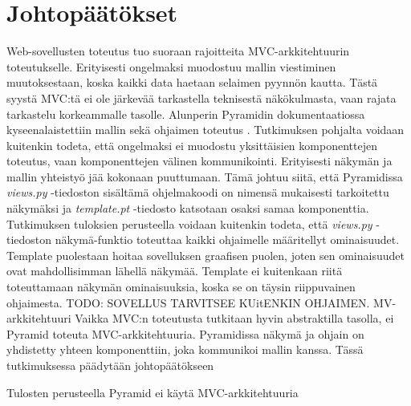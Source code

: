 \documentclass[finnish,utf8,nonumbib,palatino,kandi]{gradu2}
\begin{document}
\section{Johtopäätökset}
Web-sovellusten toteutus tuo suoraan rajoitteita MVC-arkkitehtuurin toteutukselle. Erityisesti ongelmaksi muodostuu mallin viestiminen muutoksestaan, koska kaikki data haetaan selaimen pyynnön kautta. Tästä
syystä MVC:tä ei ole järkevää tarkastella teknisestä näkökulmasta, vaan rajata tarkastelu korkeammalle tasolle. 
Alunperin Pyramidin dokumentaatiossa kyseenalaistettiin mallin sekä ohjaimen toteutus \cite{Pyramid:intr}. Tutkimuksen pohjalta voidaan kuitenkin
todeta, että ongelmaksi ei muodostu yksittäisien komponenttejen toteutus, vaan komponenttejen välinen kommunikointi. Erityisesti näkymän ja mallin yhteistyö jää
kokonaan puuttumaan. Tämä johtuu siitä, että Pyramidissa \emph{views.py} -tiedoston sisältämä ohjelmakoodi on nimensä mukaisesti tarkoitettu näkymäksi ja 
\emph{template.pt} -tiedosto katsotaan osaksi samaa komponenttia. Tutkimuksen tuloksien perusteella voidaan kuitenkin todeta, että \emph{views.py} -tiedoston näkymä-funktio toteuttaa kaikki
ohjaimelle määritellyt ominaisuudet. Template puolestaan hoitaa sovelluksen graafisen puolen, joten sen ominaisuudet ovat mahdollisimman lähellä näkymää. Template ei kuitenkaan riitä toteuttamaan näkymän ominaisuuksia, 
koska se on täysin riippuvainen ohjaimesta. TODO: SOVELLUS TARVITSEE KUitENKIN OHJAIMEN. MV-arkkitehtuuri
Vaikka MVC:n toteutusta tutkitaan hyvin abstraktilla tasolla, ei Pyramid toteuta MVC-arkkitehtuuria. Pyramidissa näkymä ja ohjain on yhdistetty yhteen komponenttiin, joka kommunikoi mallin kanssa. Tässä tutkimuksessa 
päädytään johtopäätökseen


Tulosten perusteella Pyramid ei käytä MVC-arkkitehtuuria
\end{document}
